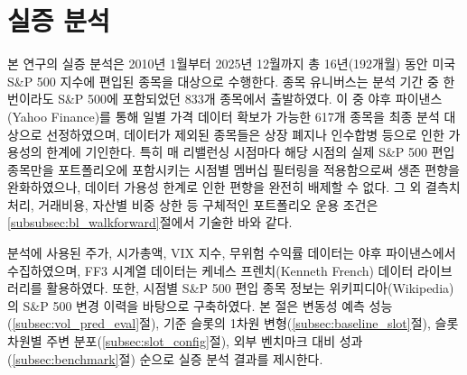 \documentclass{article}
\begin{document}

\section{실증 분석}\label{sec:result}

본 연구의 실증 분석은 2010년 1월부터 2025년 12월까지 총 16년(192개월) 동안 미국 S\&P 500 지수에 편입된 종목을 대상으로 수행한다. 종목 유니버스는 분석 기간 중 한 번이라도 S\&P 500에 포함되었던 833개 종목에서 출발하였다. 이 중 야후 파이낸스(Yahoo Finance)를 통해 일별 가격 데이터 확보가 가능한 617개 종목을 최종 분석 대상으로 선정하였으며, 데이터가 제외된 종목들은 상장 폐지나 인수합병 등으로 인한 가용성의 한계에 기인한다. 특히 매 리밸런싱 시점마다 해당 시점의 실제 S\&P 500 편입 종목만을 포트폴리오에 포함시키는 시점별 멤버십 필터링을 적용함으로써 생존 편향을 완화하였으나, 데이터 가용성 한계로 인한 편향을 완전히 배제할 수 없다. 그 외 결측치 처리, 거래비용, 자산별 비중 상한 등 구체적인 포트폴리오 운용 조건은 \ref{subsubsec:bl_walkforward}절에서 기술한 바와 같다.

분석에 사용된 주가, 시가총액, VIX 지수, 무위험 수익률 데이터는 야후 파이낸스에서 수집하였으며, FF3 시계열 데이터는 케네스 프렌치(Kenneth French) 데이터 라이브러리를 활용하였다. 또한, 시점별 S\&P 500 편입 종목 정보는 위키피디아(Wikipedia)의 S\&P 500 변경 이력을 바탕으로 구축하였다. 본 절은 변동성 예측 성능(\ref{subsec:vol_pred_eval}절), 기준 슬롯의 1차원 변형(\ref{subsec:baseline_slot}절), 슬롯 차원별 주변 분포(\ref{subsec:slot_config}절), 외부 벤치마크 대비 성과(\ref{subsec:benchmark}절) 순으로 실증 분석 결과를 제시한다.
\end{document}
